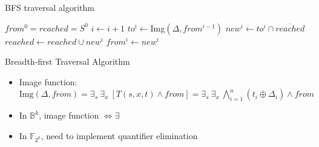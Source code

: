 \documentclass[xcolor=dvipsnames]{beamer}
\newcommand{\bi}{\begin{itemize}}
\newcommand{\ei}{\end{itemize}}
\begin{document}
\begin{frame}{\large{BFS traversal algorithm}}
\begin{algorithm}[H]
\SetAlgoNoLine
  $from^0 = reached = S^0$\;
  {
  	$i \gets i + 1$\;
\alert{	$to^i \gets$Img$(\Delta, from^{i-1})$}\;
	$new^i \gets to^i \cap \overline{reached}$\;
  	$reached \gets reached \cup new^i$\;
	$from^i \gets new^i$\;
  }
\caption {Breadth-first Traversal Algorithm}
\end{algorithm}
\pause
\bi
\item Image function: $\text{Img}(\Delta, from) = \exists _s ~\exists _x ~[ T(s, x, t)
  \land from ] = \exists _s ~\exists _x ~\bigwedge_
  {i=1}^{n} (t_i
\overline{\oplus } \Delta_i)\land from$
\item In $\mathbb B^k$, image function $\Leftrightarrow \exists$
\item In $\mathbb F_{2^k}$, need to implement \alert{quantifier elimination}
\ei
\end{frame}
\end{document}
